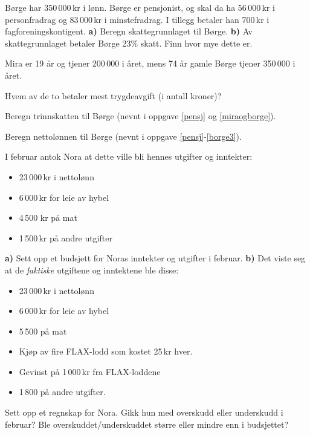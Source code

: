 \nes

Børge har 350\,000\,kr i lønn. Børge er pensjonist, og skal da ha 56\,000\,kr i personfradrag og 83\,000\,kr i minstefradrag. I tillegg betaler han 700\,kr i fagforeningskontigent. \os
\textbf{a)} Beregn skattegrunnlaget til Børge.\os
\textbf{b)} Av skattegrunnlaget betaler Børge 23\% skatt. Finn hvor mye dette er.

Mira er 19 år og tjener 200\,000 i året, mens 74 år gamle Børge tjener 350\,000 i året. \os

Hvem av de to betaler mest trygdeavgift (i antall kroner)?

Beregn trinnskatten til Børge (nevnt i oppgave \ref{pensj} og \ref{miraogborge}).

Beregn nettolønnen til Børge (nevnt i oppgave \ref{pensj}-\ref{borge3}).

\nes

I februar antok Nora at dette ville bli hennes utgifter og inntekter:
\begin{itemize}
	\item 23\,000\,kr i nettolønn 
	\item 6\,000\,kr for leie av hybel
	\item 4\,500 kr på mat
	\item 1\,500\,kr på andre utgifter
\end{itemize}
\textbf{a)} Sett opp et budsjett for Noras inntekter og utgifter i februar.\os
\textbf{b)} Det viste seg at de \textsl{faktiske} utgiftene og inntektene ble disse:
\begin{itemize}
	\item 23\,000\,kr i nettolønn
	\item 6\,000\,kr for leie av hybel
	\item 5\,500 på mat
	\item Kjøp av fire FLAX-lodd som kostet 25\,kr hver.
	\item Gevinst på 1\,000\,kr fra FLAX-loddene
	\item 1\,800 på andre utgifter.
\end{itemize}
Sett opp et regnskap for Nora. Gikk hun med overskudd eller underskudd i februar? Ble overskuddet/underskuddet større eller mindre enn i budsjettet?



